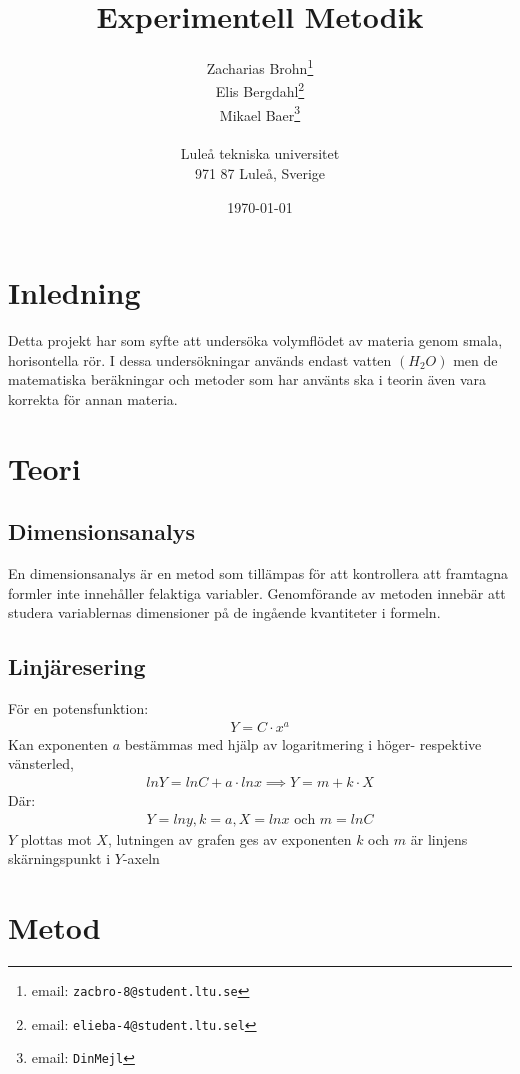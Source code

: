 \documentclass[a4paper,12pt]{article}
\title{Experimentell Metodik}
\author{Zacharias Brohn\thanks{email: \texttt{zacbro-8@student.ltu.se}}\\  
        Elis Bergdahl\thanks{email: \texttt{elieba-4@student.ltu.sel}} \\
        Mikael Baer\thanks{email: \texttt{DinMejl}} \\
        ~ \\
        Luleå tekniska universitet \\ 
        971 87 Luleå, Sverige}
\date{\today}
\begin{document}
%
\maketitle
%
\begin{abstract}
\end{abstract}
%
\section{Inledning}
    Detta projekt har som syfte att undersöka volymflödet av materia genom smala, horisontella rör. I dessa undersökningar används endast vatten $(H_2O)$ men de matematiska beräkningar och metoder som har använts ska i teorin även vara korrekta för annan materia.
%
\section{Teori}
%
\subsection{Dimensionsanalys}
    En dimensionsanalys är en metod som tillämpas för att kontrollera att framtagna formler inte innehåller felaktiga variabler. Genomförande av metoden innebär att studera variablernas dimensioner på de ingående kvantiteter i formeln.
%
\subsection{Linjäresering}
    För en potensfunktion:
        \begin{align}
            Y = C \cdot x^a
        \end{align}
    Kan exponenten $a$ bestämmas med hjälp av logaritmering i höger- respektive vänsterled,
        \begin{align}
            ln Y = ln C + a \cdot ln x \implies Y = m + k \cdot X
        \end{align}
    Där:
        \begin{align}
            Y = ln y, k = a, X = ln x \text{ och } m = ln C
        \end{align}
    $Y$ plottas mot $X$, lutningen av grafen ges av exponenten $k$ och $m$ är linjens skärningspunkt i $Y$-axeln
%
\section{Metod}
%
\end{document}
